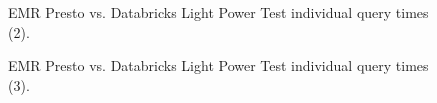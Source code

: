 \begin{figure}
   \begin{center}
   \end{center}
   \caption{EMR Presto vs. Databricks Light Power Test individual query times (2).}
   \label{fig:prestoVsDatabricksLightPowerTestIndividualQueries2}
\end{figure}

\begin{figure}
   \begin{center}
   \end{center}
   \caption{EMR Presto vs. Databricks Light Power Test individual query times (3).}
   \label{fig:prestoVsDatabricksLightPowerTestIndividualQueries3}
\end{figure}

